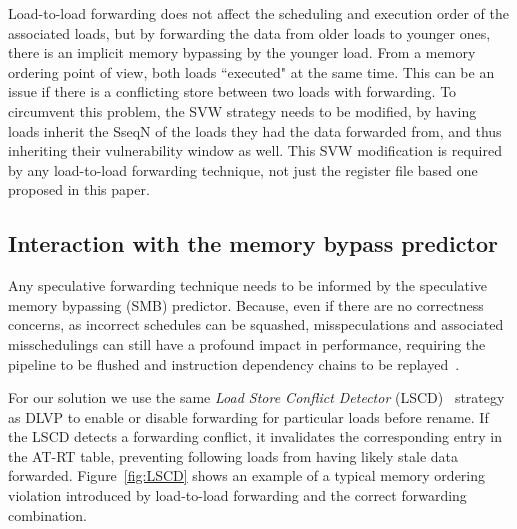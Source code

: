 \documentclass{sig-alternate}
\begin{document}
Load-to-load forwarding does not affect the scheduling and execution order of the associated loads, but by forwarding the data from older loads to younger ones, there is an implicit memory bypassing by the younger load. From a memory ordering point of view, both loads ``executed" at the same time. This can be an issue if there is a conflicting store between two loads with forwarding. To circumvent this problem, the SVW strategy needs to be modified, by having loads inherit the SseqN of the loads they had the data forwarded from, and thus inheriting their vulnerability window as well. 
This SVW modification is required by any load-to-load forwarding technique, not just the register file based one proposed in this paper. 





\subsection{Interaction with the memory bypass predictor}
Any speculative forwarding technique needs to be informed by the speculative memory bypassing (SMB) predictor. Because, even if there are no correctness concerns, as incorrect schedules can be squashed, misspeculations and associated misschedulings can still have a profound impact in performance, requiring the pipeline to be flushed and instruction dependency chains to be replayed~\cite{alves2018dynamically, Bank/perais15}. 


For our solution we use the same \textit{Load Store Conflict Detector} (LSCD)~\cite{DLVP/sheikh17} strategy as DLVP to enable or disable forwarding for particular loads before rename. If the LSCD detects a forwarding conflict, it invalidates the corresponding entry in the AT-RT table, preventing following loads from having likely stale data forwarded.
Figure~\ref{fig:LSCD} shows an example of a typical memory ordering violation introduced by load-to-load forwarding and the correct forwarding combination. 
\end{document}
